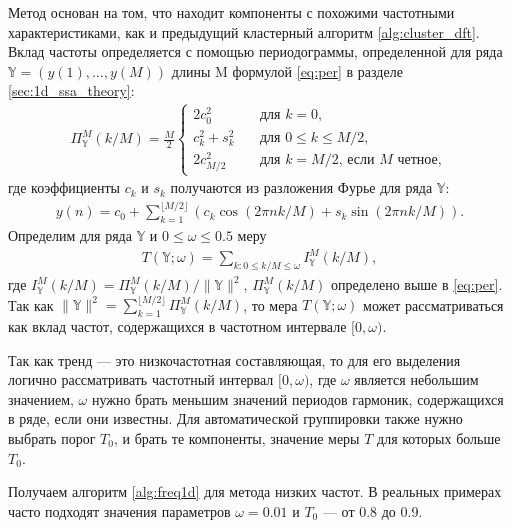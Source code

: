 \documentclass[specialist,
               substylefile = spbu.rtx,
               subf,href,colorlinks=true, 12pt]{disser}
\begin{document}
Метод основан на том, что находит компоненты с похожими частотными характеристиками, как и предыдущий кластерный алгоритм \ref{alg:cluster_dft}. Вклад частоты определяется с помощью периодограммы, определенной для ряда $\mathbb{Y}=(y(1),\ldots,y({M}))$ длины M формулой \eqref{eq:per} в разделе \ref{sec:1d_ssa_theory}:
\begin{gather*}
 \Pi_{\mathbb{Y}}^M(k/M) = \frac{M}{2}
\begin{cases}
2c_0^2 &\quad \text{для } k = 0, \\
c_k^2 + s_k^2 & \quad \text{для }  0 \leqslant k \leqslant M/2, \\
2c_{M/2}^2 & \quad \text{для } k = M/2   \text{, если } M \text{ четное},
\end{cases}
\end{gather*}
где коэффициенты $c_k$ и $s_k$ получаются из разложения Фурье для ряда $\mathbb{Y}$:
\begin{gather*}
y(n) = c_0 + \sum_{k=1}^{\lfloor M/2 \rfloor}\left(c_k\cos(2\pi n k /M) + s_k\sin(2\pi n k/M) \right).
\end{gather*}
Определим для ряда $\mathbb{Y}$ и $0 \leqslant  \omega \leqslant 0.5$ меру
\begin{gather}
\label{eq:T_measure}
T(\mathbb{Y}; \omega) = \sum_{k: 0 \leqslant k/M \leqslant \omega} I_{\mathbb{Y}}^M(k/M),
\end{gather}
где $I_{\mathbb{Y}}^M(k/M) = \Pi_{\mathbb{Y}}^M(k/M) / \|\mathbb{Y}\|^2$, $\Pi_{\mathbb{Y}}^M(k/M)$ определено выше в \eqref{eq:per}. Так как $\|\mathbb{Y}\|^2  = \sum_{k=1}^{\lfloor M/2 \rfloor} \Pi_{\mathbb{Y}}^M(k/M)$, то мера $T(\mathbb{Y}; \omega)$ может рассматриваться как вклад частот, содержащихся в частотном интервале $[0, \omega)$.

Так как тренд --- это низкочастотная составляющая, то для его выделения логично рассматривать частотный интервал $[0, \omega)$, где $\omega$ является небольшим значением, $\omega$ нужно брать меньшим значений периодов гармоник, содержащихся в ряде, если они известны.
Для автоматической группировки также нужно выбрать порог $T_0$, и брать те компоненты, значение меры $T$ для которых больше $T_0$.

Получаем алгоритм \ref{alg:freq1d} для метода низких частот.
В реальных примерах часто подходят значения параметров $\omega = 0.01$ и $T_0$ --- от 0.8 до 0.9.
\end{document}
